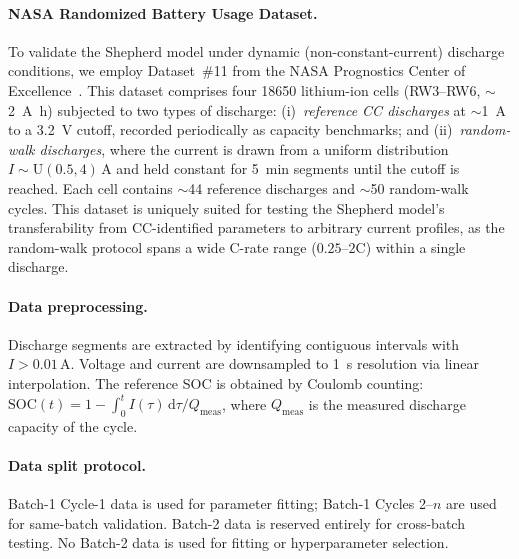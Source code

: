 \documentclass[5p,times,number]{elsarticle}
\begin{document}
\paragraph{NASA Randomized Battery Usage Dataset.}
To validate the Shepherd model under dynamic (non-constant-current) discharge conditions, we employ Dataset~\#11 from the NASA Prognostics Center of Excellence~\cite{Bole2014}.
This dataset comprises four 18650 lithium-ion cells (RW3--RW6, $\sim$\SI{2}{\ampere\hour}) subjected to two types of discharge:
(i)~\emph{reference CC discharges} at $\sim$\SI{1}{\ampere} to a \SI{3.2}{\volt} cutoff, recorded periodically as capacity benchmarks; and
(ii)~\emph{random-walk discharges}, where the current is drawn from a uniform distribution $I \sim \mathrm{U}(0.5, 4)$\,A and held constant for \SI{5}{\minute} segments until the cutoff is reached.
Each cell contains $\sim$44 reference discharges and $\sim$50 random-walk cycles.
This dataset is uniquely suited for testing the Shepherd model's transferability from CC-identified parameters to arbitrary current profiles, as the random-walk protocol spans a wide C-rate range ($0.25$--$2$C) within a single discharge.

\paragraph{Data preprocessing.}
Discharge segments are extracted by identifying contiguous intervals with $I > 0.01$\,A.
Voltage and current are downsampled to \SI{1}{\second} resolution via linear interpolation.
The reference SOC is obtained by Coulomb counting:
$\mathrm{SOC}(t) = 1 - \int_0^t I(\tau)\,\mathrm{d}\tau / Q_{\mathrm{meas}}$,
where $Q_{\mathrm{meas}}$ is the measured discharge capacity of the cycle.

\paragraph{Data split protocol.}
Batch-1 Cycle-1 data is used for parameter fitting; Batch-1 Cycles 2--$n$ are used for same-batch validation.
Batch-2 data is reserved entirely for cross-batch testing.
No Batch-2 data is used for fitting or hyperparameter selection.
\end{document}
